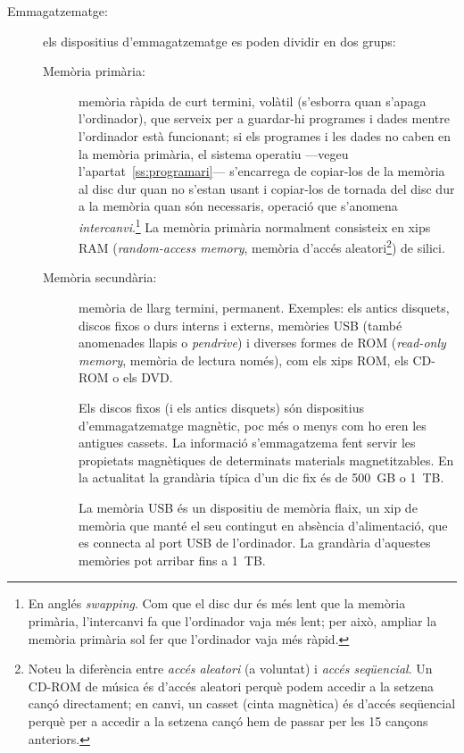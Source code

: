 \begin{description}
\item[Emmagatzematge:] els dispositius d'emmagatzematge es poden
  dividir en dos grups:
  \begin{description}
  \item[Memòria primària:] memòria ràpida de curt termini, volàtil
    (s'esborra quan s'apaga l'ordinador), que serveix per a guardar-hi
    programes i dades mentre l'ordinador està funcionant; si els
    programes i les dades no caben en la memòria primària, el sistema
    operatiu ---vegeu l'apartat~\ref{ss:programari}--- s'encarrega de
    copiar-los de la memòria al disc dur quan no s'estan usant i
    copiar-los de tornada del disc dur a la memòria quan són
    necessaris, operació que s'anomena \emph{intercanvi}.\footnote{En
      anglés \emph{swapping}. Com que el disc dur és més lent que la
      memòria primària, l'intercanvi fa que l'ordinador vaja més lent;
      per això, ampliar la memòria primària sol fer que l'ordinador
      vaja més ràpid.} La memòria primària normalment consisteix en
    xips RAM (\emph{random-access memory}, memòria d'accés
    aleatori\footnote{Noteu la diferència entre \emph{accés aleatori}
      (a voluntat) i \emph{accés seqüencial}. Un CD-ROM de música és
      d'accés aleatori perquè podem accedir a la setzena cançó
      directament; en canvi, un casset (cinta magnètica) és d'accés
      seqüencial perquè per a accedir a la setzena cançó hem de passar
      per les 15 cançons anteriors.}) de silici.
      
  \item[Memòria secundària:] memòria de llarg termini, permanent.
    Exemples: els antics disquets, discos fixos o durs interns i
    externs, memòries USB (també anomenades llapis o \emph{pendrive})
    i diverses formes de ROM (\emph{read-only memory}, memòria de
    lectura només), com els xips ROM, els CD-ROM o els DVD.  

    Els discos fixos (i els antics disquets) són dispositius
    d'emmagatzematge magnètic, poc més o menys com ho eren les
    antigues cassets. La informació s'emmagatzema fent servir les
    propietats magnètiques de determinats materials magnetitzables. En
    la actualitat la grandària típica d'un dic fix és de 500~GB o
    1~TB.

    La memòria USB és un dispositiu de memòria flaix, un xip de
    memòria que manté el seu contingut en absència d'alimentació, que
    es connecta al port USB de l'ordinador. La grandària d'aquestes
    memòries pot arribar fins a 1~TB.


\end{description}
\end{description}
